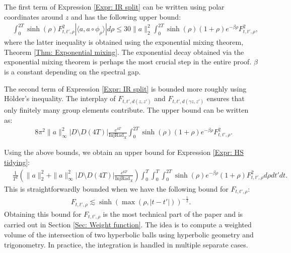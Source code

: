 \documentclass[11pt,twoside,reqno]{amsart} \usepackage{a4wide} \usepackage[T1]{fontenc} \usepackage[utf8]{inputenc} \usepackage{soul}  \usepackage{amsmath} \usepackage{amsfonts} \usepackage{amssymb} \usepackage{mathtools} \usepackage{amsthm} \usepackage{xcolor} \usepackage{graphicx} \usepackage{hyperref} \usepackage{standalone} \usepackage{esint} \usepackage{comment} \usepackage[left=2.3cm,top=3cm,right=2.3cm]{geometry} \usepackage{bm} \usepackage{svg} \usepackage{float} \numberwithin{equation}{section} \theoremstyle{plain} \newtheorem{thm}{Theorem}[section] \newtheorem{theorem}[thm]{Theorem} \newtheorem*{theorem*}{Theorem}\newtheorem{conj}[thm]{Conjecture} \newtheorem{lemma}[thm]{Lemma} \newtheorem{prop}[thm]{Proposition} \newtheorem{proposition}[thm]{Proposition} \newtheorem{cor}[thm]{Corollary} \newtheorem{question}[thm]{Question} \newtheorem{corollary}[thm]{Corollary} \newtheorem{assumption}[thm]{Assumption} \theoremstyle{definition} \newtheorem{defn}[thm]{Definition} \newtheorem{choice}[thm]{Choice} \newtheorem{definition}[thm]{Definition} \newtheorem{ex}[thm]{Example} \newtheorem{notation}[thm]{Notation} \newtheorem*{ack}{Acknowledgements} \theoremstyle{remark} \newtheorem{remark}[thm]{Remark} \newtheorem{bigremark}[thm]{Remark} \usepackage{xcolor} \newcommand{\red}[1]{ {\color{Red}#1} } \newcommand{\blue}[1]{ {\color{Blue}#1} } \author{Kai Hippi} \address{Aalto University, Espoo, Finland} \email{kai.hippi@aalto.fi}
\begin{document}
The first term of Expression \eqref{Expr: IR split} can be written using polar coordinates around $ z $ and has the following upper bound:
\begin{align*}
	&
	\int_{0}^{2T} \sinh( \rho ) F_{t,t',\rho}^{2} \left| \langle a, a \circ \phi_{\rho} \rangle \right|  d\rho \leq 30 \| a \|_{2}^{2} \int_{0}^{2T} \sinh( \rho ) ( 1 + \rho ) e^{ -\beta \rho } F_{t,t',\rho}^{2},
\end{align*}
where the latter inequality is obtained using the exponential mixing theorem, Theorem \ref{Thm: Exponential mixing}. The exponential decay obtained via the exponential mixing theorem is perhaps the most crucial step in the entire proof. $ \beta $ is a constant depending on the spectral gap.

The second term of Expression \eqref{Expr: IR split} is bounded more roughly using Hölder's inequality. The interplay of $ F_{t,t', d( z,z' )} $ and $ F_{t,t',d( \gamma z, z' )} $ ensures that only finitely many group elements contribute. The upper bound can be written as:
\begin{align*}
	&
	8 \pi^{2} \| a \|_{\infty}^{2} |D \setminus D( 4T )| \frac{e^{4T}}{ \operatorname{InjRad}_{X} } \int_{0}^{2T} \sinh( \rho ) ( 1 + \rho ) e^{ -\beta \rho } F_{t,t',\rho}^{2}.
\end{align*}

Using the above bounds, we obtain an upper bound for Expression \eqref{Expr: HS tidying}:
\begin{align*}
	&
	\frac{1}{T^{2}} \left( \| a \|_{2}^{2} + \| a\|_{\infty}^{2} |D \setminus D( 4T )| \frac{e^{6T}}{ \operatorname{InjRad}_{X} } \right) \int_{0}^{T} \int_{0}^{T} \int_{0}^{2T} \sinh( \rho ) e^{ - \beta \rho } ( 1+ \rho ) F_{t,t',\rho}^{2} d \rho dt' dt. 
\end{align*}
This is straightforwardly bounded when we have the following bound for $ F_{t,t',\rho} $:
\begin{align}
	\label{Expr: Final bound}
	F_{t,t',\rho} \lesssim \sinh( \max( \rho, | t - t' | ) )^{-\tfrac{1}{2}}.
\end{align}
Obtaining this bound for \( F_{t,t',\rho} \) is the most technical part of the paper and is carried out in Section \ref{Sec: Weight function}. The idea is to compute a weighted volume of the intersection of two hyperbolic balls using hyperbolic geometry and trigonometry. In practice, the integration is handled in multiple separate cases.
\end{document}
